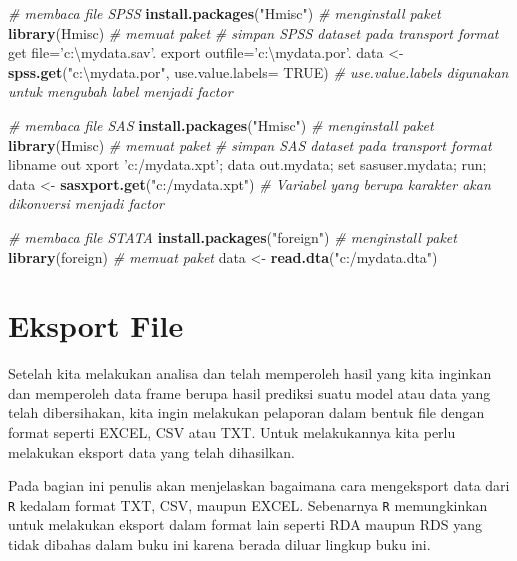\documentclass[]{book}
\newenvironment{Shaded}{\begin{snugshade}}{\end{snugshade}}
\newcommand{\KeywordTok}[1]{\textcolor[rgb]{0.13,0.29,0.53}{\textbf{#1}}}
\newcommand{\DataTypeTok}[1]{\textcolor[rgb]{0.13,0.29,0.53}{#1}}
\newcommand{\StringTok}[1]{\textcolor[rgb]{0.31,0.60,0.02}{#1}}
\newcommand{\CommentTok}[1]{\textcolor[rgb]{0.56,0.35,0.01}{\textit{#1}}}
\newcommand{\OtherTok}[1]{\textcolor[rgb]{0.56,0.35,0.01}{#1}}
\newcommand{\NormalTok}[1]{#1}
\begin{document}
\begin{Shaded}
\begin{Highlighting}[]
\CommentTok{# membaca file SPSS}
\KeywordTok{install.packages}\NormalTok{(}\StringTok{"Hmisc"}\NormalTok{) }\CommentTok{# menginstall paket}
\KeywordTok{library}\NormalTok{(Hmisc) }\CommentTok{# memuat paket}
\CommentTok{# simpan SPSS dataset pada transport format}
\NormalTok{get file=}\StringTok{'c:\textbackslash{}mydata.sav'}\NormalTok{.}
\NormalTok{export outfile=}\StringTok{'c:\textbackslash{}mydata.por'}\NormalTok{. }
\NormalTok{data <-}\StringTok{ }\KeywordTok{spss.get}\NormalTok{(}\StringTok{"c:\textbackslash{}mydata.por"}\NormalTok{, }\DataTypeTok{use.value.labels=} \OtherTok{TRUE}\NormalTok{) }
\CommentTok{# use.value.labels digunakan untuk mengubah label menjadi factor}


\CommentTok{# membaca file SAS}
\KeywordTok{install.packages}\NormalTok{(}\StringTok{"Hmisc"}\NormalTok{) }\CommentTok{# menginstall paket}
\KeywordTok{library}\NormalTok{(Hmisc) }\CommentTok{# memuat paket}
\CommentTok{# simpan SAS dataset pada transport format}
\NormalTok{libname out xport }\StringTok{'c:/mydata.xpt'}\NormalTok{;}
\NormalTok{data out.mydata;}
\NormalTok{set sasuser.mydata;}
\NormalTok{run;}
\NormalTok{data <-}\StringTok{ }\KeywordTok{sasxport.get}\NormalTok{(}\StringTok{"c:/mydata.xpt"}\NormalTok{) }
\CommentTok{# Variabel yang berupa karakter akan dikonversi menjadi factor}


\CommentTok{# membaca file STATA}
\KeywordTok{install.packages}\NormalTok{(}\StringTok{"foreign"}\NormalTok{) }\CommentTok{# menginstall paket}
\KeywordTok{library}\NormalTok{(foreign) }\CommentTok{# memuat paket}
\NormalTok{data <-}\StringTok{ }\KeywordTok{read.dta}\NormalTok{(}\StringTok{"c:/mydata.dta"}\NormalTok{)}
\end{Highlighting}
\end{Shaded}

\section{Eksport File}\label{eksport-file}

Setelah kita melakukan analisa dan telah memperoleh hasil yang kita
inginkan dan memperoleh data frame berupa hasil prediksi suatu model
atau data yang telah dibersihakan, kita ingin melakukan pelaporan dalam
bentuk file dengan format seperti EXCEL, CSV atau TXT. Untuk
melakukannya kita perlu melakukan eksport data yang telah dihasilkan.

Pada bagian ini penulis akan menjelaskan bagaimana cara mengeksport data
dari \texttt{R} kedalam format TXT, CSV, maupun EXCEL. Sebenarnya
\texttt{R} memungkinkan untuk melakukan eksport dalam format lain
seperti RDA maupun RDS yang tidak dibahas dalam buku ini karena berada
diluar lingkup buku ini.
\end{document}

